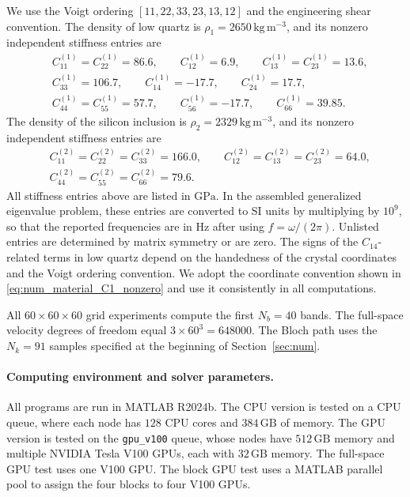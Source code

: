 \documentclass[11pt,oneside]{article}
\numberwithin{equation}{section}
\theoremstyle{plain}
\theoremstyle{remark}
\begin{document}
We use the Voigt ordering \([11,22,33,23,13,12]\) and the engineering shear convention. The density of low quartz is
\(\rho_1=2650\,\mathrm{kg\,m^{-3}}\), and its nonzero independent stiffness entries are
\begin{equation}
\label{eq:num_material_C1_nonzero}
\begin{aligned}
&C^{(1)}_{11}=C^{(1)}_{22}=86.6,
\qquad C^{(1)}_{12}=6.9,
\qquad C^{(1)}_{13}=C^{(1)}_{23}=13.6,\\
&C^{(1)}_{33}=106.7,
\qquad C^{(1)}_{14}=-17.7,
\qquad C^{(1)}_{24}=17.7,\\
&C^{(1)}_{44}=C^{(1)}_{55}=57.7,
\qquad C^{(1)}_{56}=-17.7,
\qquad C^{(1)}_{66}=39.85 .
\end{aligned}
\end{equation}
The density of the silicon inclusion is \(\rho_2=2329\,\mathrm{kg\,m^{-3}}\), and its nonzero independent stiffness entries are
\begin{equation}
\label{eq:num_material_C2_nonzero}
\begin{aligned}
&C^{(2)}_{11}=C^{(2)}_{22}=C^{(2)}_{33}=166.0,
\qquad C^{(2)}_{12}=C^{(2)}_{13}=C^{(2)}_{23}=64.0,\\
&C^{(2)}_{44}=C^{(2)}_{55}=C^{(2)}_{66}=79.6 .
\end{aligned}
\end{equation}
All stiffness entries above are listed in \(\mathrm{GPa}\). In the assembled generalized eigenvalue problem, these entries are converted to SI units by multiplying by \(10^9\), so that the reported frequencies are in Hz after using \(f=\omega/(2\pi)\). Unlisted entries are determined by matrix symmetry or are zero. The signs of the \(C_{14}\)-related terms in low quartz depend on the handedness of the crystal coordinates and the Voigt ordering convention. We adopt the coordinate convention shown in \eqref{eq:num_material_C1_nonzero} and use it consistently in all computations.

All \(60\times60\times60\) grid experiments compute the first \(N_b=40\) bands. The full-space velocity degrees of freedom equal \(3\times60^3=648000\). The Bloch path uses the \(N_k=91\) samples specified at the beginning of Section~\ref{sec:num}.

\paragraph{Computing environment and solver parameters.}
All programs are run in MATLAB R2024b. The CPU version is tested on a CPU queue, where each node has \(128\) CPU cores and \(384\,\mathrm{GB}\) of memory. The GPU version is tested on the \texttt{gpu\_v100} queue, whose nodes have \(512\,\mathrm{GB}\) memory and multiple NVIDIA Tesla V100 GPUs, each with \(32\,\mathrm{GB}\) memory. The full-space GPU test uses one V100 GPU. The block GPU test uses a MATLAB parallel pool to assign the four blocks to four V100 GPUs.
\end{document}

